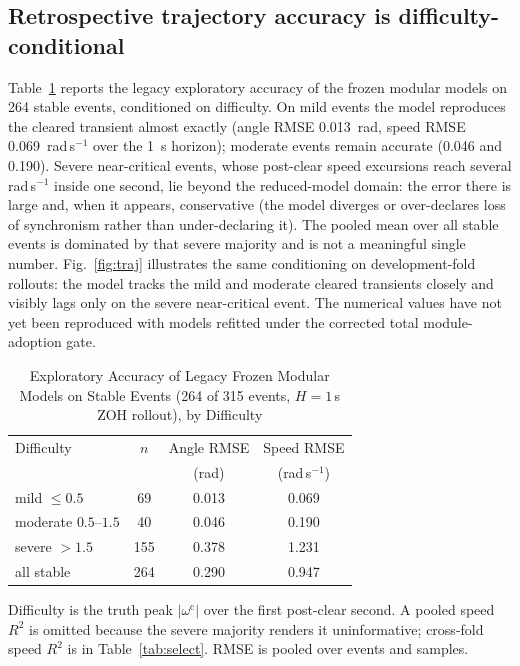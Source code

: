 \documentclass[journal]{IEEEtran}
\begin{document}
\subsection{Retrospective trajectory accuracy is difficulty-conditional}
\label{sec:traj}
Table~\ref{tab:traj} reports the legacy exploratory accuracy of the frozen
modular models on 264 stable events, conditioned on difficulty. On mild
events the model reproduces the cleared transient almost exactly
(angle RMSE 0.013~rad, speed RMSE 0.069~rad\,s$^{-1}$ over the 1~s horizon);
moderate events remain accurate (0.046 and 0.190). Severe near-critical events,
whose post-clear speed excursions reach several rad\,s$^{-1}$ inside one second,
lie beyond the reduced-model domain: the error there is large and, when it
appears, conservative (the model diverges or over-declares loss of synchronism
rather than under-declaring it). The pooled mean over all stable events is
dominated by that severe majority and is not a meaningful single number.
Fig.~\ref{fig:traj} illustrates the same conditioning on development-fold
rollouts: the model tracks the mild and moderate cleared transients closely and
visibly lags only on the severe near-critical event. The numerical values have
not yet been reproduced with models refitted under the corrected total
module-adoption gate.

\begin{table}[!t]
\caption{Exploratory Accuracy of Legacy Frozen Modular Models on Stable Events
(264 of 315 events, $H{=}1$\,s ZOH rollout), by Difficulty}
\label{tab:traj}
\centering
\begin{tabular}{lccc}
\toprule
Difficulty & $n$ & Angle RMSE & Speed RMSE \\
& & (rad) & (rad\,s$^{-1}$) \\
\midrule
mild $\leq 0.5$        & 69  & 0.013 & 0.069 \\
moderate $0.5$--$1.5$  & 40  & 0.046 & 0.190 \\
severe $>1.5$          & 155 & 0.378 & 1.231 \\
\midrule
all stable             & 264 & 0.290 & 0.947 \\
\bottomrule
\end{tabular}
\par\smallskip
\parbox{\columnwidth}{\footnotesize Difficulty is the truth peak
$|\omega^{\mathrm c}|$ over the first post-clear second. A pooled speed $R^2$ is
omitted because the severe majority renders it uninformative; cross-fold speed
$R^2$ is in Table~\ref{tab:select}. RMSE is pooled over events and samples.}
\end{table}
\end{document}

